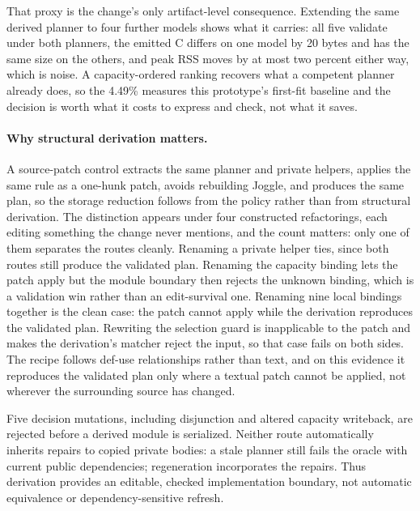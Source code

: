 \documentclass[sigplan,anonymous,review]{acmart}
\begin{document}
That proxy is the change's only artifact-level consequence. Extending the same
derived planner to four further models shows what it carries: all five validate
under both planners, the emitted C differs on one model by 20 bytes and has the
same size on the others, and peak RSS moves by at most two percent either way,
which is noise. A capacity-ordered ranking recovers what a competent planner
already does, so the 4.49\% measures this prototype's first-fit baseline and the
decision is worth what it costs to express and check, not what it saves.

\paragraph{Why structural derivation matters.}
A source-patch control extracts the same planner and private helpers, applies
the same rule as a one-hunk patch, avoids rebuilding Joggle, and produces the
same plan, so the storage reduction follows from the policy rather than from
structural derivation. The distinction appears under four constructed
refactorings, each editing something the change never mentions, and the count
matters: only one of them separates the routes cleanly. Renaming a private
helper ties, since both routes still produce the validated plan. Renaming the
capacity binding lets the patch apply but the module boundary then rejects the
unknown binding, which is a validation win rather than an edit-survival one.
Renaming nine local bindings together is the clean case: the patch cannot apply
while the derivation reproduces the validated plan. Rewriting the selection
guard is inapplicable to the patch and makes the derivation's matcher reject the
input, so that case fails on both sides. The recipe follows def-use
relationships rather than text, and on this evidence it reproduces the validated
plan only where a textual patch cannot be applied, not wherever the surrounding
source has changed.

Five decision mutations, including disjunction and altered capacity writeback,
are rejected before a derived module is serialized. Neither route automatically
inherits repairs to copied private bodies: a stale planner still fails the
oracle with current public dependencies; regeneration incorporates the repairs.
Thus derivation provides an editable, checked implementation boundary, not
automatic equivalence or dependency-sensitive refresh.
\end{document}
